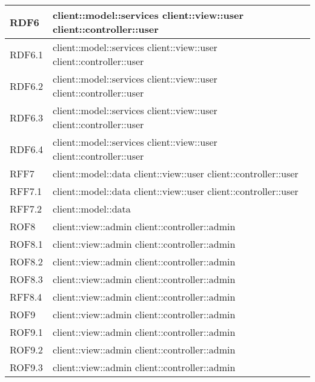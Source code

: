 \begin{center}
\begin{longtable}{| p{4cm} | p{8cm} |}
RDF6   &  client::model::services \newline client::view::user \newline client::controller::user \\
\hline
RDF6.1   &  client::model::services \newline client::view::user \newline client::controller::user \\
\hline
RDF6.2   &  client::model::services \newline client::view::user \newline client::controller::user \\
\hline
RDF6.3   &  client::model::services \newline client::view::user \newline client::controller::user \\
\hline
RDF6.4   &  client::model::services \newline client::view::user \newline client::controller::user \\
\hline

RFF7   &  client::model::data \newline client::view::user \newline client::controller::user \\
\hline
RFF7.1   &  client::model::data \newline client::view::user \newline client::controller::user \\
\hline
RFF7.2   &  client::model::data \\
\hline

ROF8   &  client::view::admin \newline client::controller::admin \\
\hline
ROF8.1   &  client::view::admin \newline client::controller::admin \\
\hline
ROF8.2   &  client::view::admin \newline client::controller::admin \\
\hline
ROF8.3   &  client::view::admin \newline client::controller::admin \\
\hline
RFF8.4   &  client::view::admin \newline client::controller::admin \\
\hline

ROF9   &  client::view::admin \newline client::controller::admin \\
\hline
ROF9.1   &  client::view::admin \newline client::controller::admin  \\
\hline
ROF9.2   &  client::view::admin \newline client::controller::admin  \\
\hline
ROF9.3   &  client::view::admin \newline client::controller::admin  \\
\hline


\end{longtable}
\end{center}
